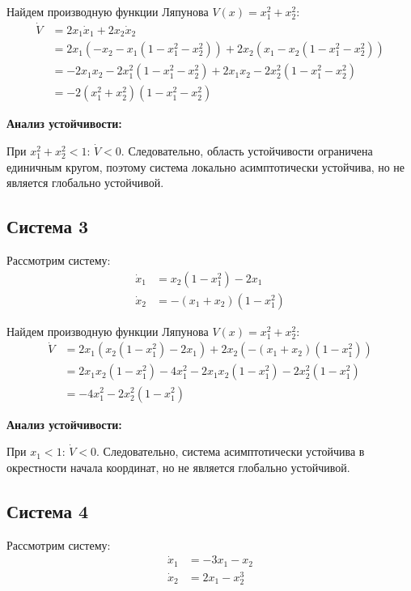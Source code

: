 Найдем производную функции Ляпунова $V(x) = x_1^2 + x_2^2$:
\begin{align*}
\dot{V} &= 2x_1 \dot{x}_1 + 2x_2 \dot{x}_2 \\
&= 2x_1\left(-x_2 - x_1(1 - x_1^2 - x_2^2)\right) + 2x_2\left(x_1 - x_2(1 - x_1^2 - x_2^2)\right) \\
&= -2x_1 x_2 - 2x_1^2(1 - x_1^2 - x_2^2) + 2x_1 x_2 - 2x_2^2(1 - x_1^2 - x_2^2) \\
&= -2(x_1^2 + x_2^2)(1 - x_1^2 - x_2^2)
\end{align*}

\textbf{Анализ устойчивости:}

При $x_1^2 + x_2^2 < 1$: $\dot{V} < 0$. Следовательно, область устойчивости 
ограничена единичным кругом, поэтому система локально асимптотически устойчива, 
но не является глобально устойчивой.

\subsection{Система 3}

Рассмотрим систему:
\begin{align*}
\dot{x}_1 &= x_2(1 - x_1^2) - 2x_1 \\
\dot{x}_2 &= -(x_1 + x_2)(1 - x_1^2)
\end{align*}

Найдем производную функции Ляпунова $V(x) = x_1^2 + x_2^2$:
\begin{align*}
\dot{V} &= 2x_1\left(x_2(1 - x_1^2) - 2x_1\right) + 2x_2\left(-(x_1 + x_2)(1 - x_1^2)\right) \\
&= 2x_1 x_2(1 - x_1^2) - 4x_1^2 - 2x_1 x_2(1 - x_1^2) - 2x_2^2(1 - x_1^2) \\
&= -4x_1^2 - 2x_2^2(1 - x_1^2)
\end{align*}

\textbf{Анализ устойчивости:}

При $x_1 < 1$: $\dot{V} < 0$. Следовательно, система асимптотически
устойчива в окрестности начала координат, но не является глобально устойчивой.

\subsection*{Система 4}

Рассмотрим систему:
\begin{align*}
\dot{x}_1 &= -3x_1 - x_2 \\
\dot{x}_2 &= 2x_1 - x_2^3
\end{align*}

